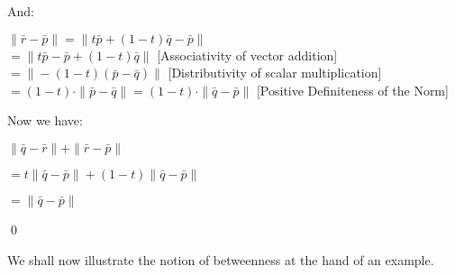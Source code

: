 \begin{proofbox}
\vspace{1em}

And:

$\|\bar{r} - \bar{p}\| = \|t\bar{p} + (1 - t)\bar{q} - \bar{p}\|$\\
\quad $= \|t\bar{p} - \bar{p} + (1 - t)\bar{q}\|$ \hfill [Associativity of vector addition] \\
\quad $= \|-(1 - t)(\bar{p} - \bar{q})\|$ \hfill [Distributivity of scalar multiplication] \\
\quad $= (1 - t) \cdot \|\bar{p} - \bar{q}\| = (1 - t) \cdot \|\bar{q} - \bar{p}\|$ \hfill [Positive  Definiteness of the Norm]

\vspace{1em}

Now we have:

$\|\bar{q} - \bar{r}\| + \|\bar{r} - \bar{p}\|$

\quad $= t\|\bar{q} - \bar{p}\| + (1 - t)\|\bar{q} - \bar{p}\|$

\quad $= \|\bar{q} - \bar{p}\|$

\hfill \qed

\end{proofbox}

\newpage

We shall now illustrate the notion of betweenness at the hand of an example.

